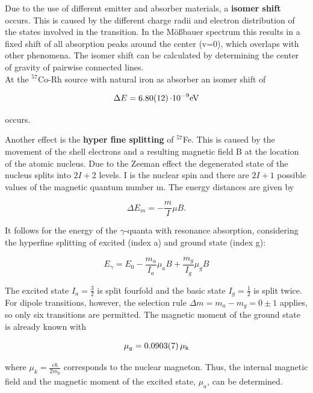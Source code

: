 

Due to the use of different emitter and absorber materials, a \textbf{isomer shift} occurs. This is caused by the different charge radii and electron distribution of the states involved in the transition.
 In the Mößbauer spectrum this results in a fixed shift of all absorption peaks around  the center (v=0), which overlaps with other phenomena. The isomer shift can be calculated by determining the center of gravity of pairwise connected lines. \\
At the $^{57}$Co-Rh source with natural iron as absorber an isomer shift of

\begin{equation}
\label{eq:isofe}
\Delta E = \SI{6.80 \pm 0.12}{\cdot 10^{-9} eV}
\end{equation}

occurs.

Another effect is the \textbf{hyper fine splitting} of $^{57}$Fe. This is caused by the movement of the shell electrons and a resulting magnetic field B at the location of the atomic nucleus.
Due to the Zeeman effect the degenerated state of the nucleus splits into $2I + $2 levels. I is the nuclear spin and there are $2I+1$ possible values of the magnetic quantum number m. The energy distances are given by

\begin{equation}
\label{eq:hyp1}
\Delta E_m = -\frac{m}{I} \mu B.
\end{equation}

It follows for the energy of the $\gamma$-quanta with resonance absorption, considering the hyperfine splitting of excited (index a) and ground state (index g):

\begin{equation}
   E_{\gamma} = E_0 - \frac{m_a}{I_a}\mu_aB + \frac{m_g}{I_g}\mu_gB
\end{equation}

The excited state $I_a = \frac{3}{2}$ is split fourfold and the basic state $I_g =\frac{1}{2}$ is split twice.
For dipole transitions, however, the selection rule $\Delta m = m_a -m_g = 0\pm1$ applies, so only six transitions are permitted. The magnetic moment of the ground state is already known with

\begin{equation}
    \mu_g = \SI{0.0903\pm 0.0007}{\mu_k}
\end{equation}

where $\mu_k=\frac{e \hbar}{2m_p} $ corresponds to the nuclear magneton. Thus, the internal magnetic field and the magnetic moment of the excited state, $\mu_a$, can be determined.

